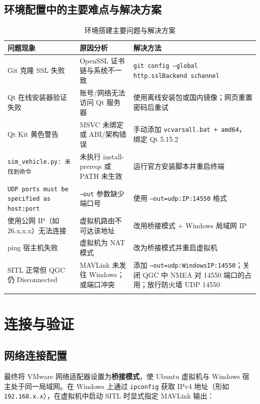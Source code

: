 \documentclass[12pt,a4paper]{article}
\begin{document}
\subsection{环境配置中的主要难点与解决方案}

\begin{longtable}{p{3.2cm}p{4.5cm}p{5.8cm}}
\toprule
\textbf{问题现象} & \textbf{原因分析} & \textbf{解决方法} \\
\midrule
\endhead
Git 克隆 SSL 失败 & OpenSSL 证书链与系统不一致 & \texttt{git config --global http.sslBackend schannel} \\
\midrule
Qt 在线安装器验证失败 & 账号/网络无法访问 Qt 服务器 & 使用离线安装包或国内镜像；网页重置密码后重试 \\
\midrule
Qt Kit 黄色警告 & MSVC 未绑定或 ABI/架构错误 & 手动添加 \texttt{vcvarsall.bat + amd64}，绑定 Qt 5.15.2 \\
\midrule
\texttt{sim\_vehicle.py: 未找到命令} & 未执行 install-prereqs 或 PATH 未生效 & 运行官方安装脚本并重启终端 \\
\midrule
\texttt{UDP ports must be specified as host:port} & \texttt{--out} 参数缺少端口号 & 使用 \texttt{--out=udp:IP:14550} 格式 \\
\midrule
使用公网 IP（如 26.x.x.x）无法连接 & 虚拟机路由不可达该地址 & 改用桥接模式 + Windows 局域网 IP \\
\midrule
ping 宿主机失败 & 虚拟机为 NAT 模式 & 改为桥接模式并重启虚拟机 \\
\midrule
SITL 正常但 QGC 仍 Disconnected & MAVLink 未发往 Windows；或端口冲突 & 添加 \texttt{--out=udp:WindowsIP:14550}；关闭 QGC 中 NMEA 对 14550 端口的占用；放行防火墙 UDP 14550 \\
\bottomrule
\caption{环境搭建主要问题与解决方案}
\end{longtable}

\section{连接与验证}

\subsection{网络连接配置}

最终将 VMware 网络适配器设置为\textbf{桥接模式}，使 Ubuntu 虚拟机与 Windows 宿主处于同一局域网。在 Windows 上通过 \texttt{ipconfig} 获取 IPv4 地址（形如 \texttt{192.168.x.x}），在虚拟机中启动 SITL 时显式指定 MAVLink 输出：
\end{document}
